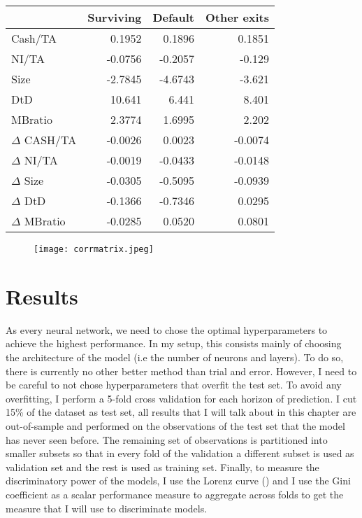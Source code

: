 \begin{table}[]
    \centering
    \begin{tabular}{lrrr}
    \hline \hline
                 & Surviving &   Default  & Other exits \\
    \hline
Cash/TA          &  0.1952 &  0.1896  &    0.1851 \\
NI/TA            & -0.0756 & -0.2057  &   -0.129 \\
Size             & -2.7845 & -4.6743  &   -3.621 \\
DtD              & 10.641 &  6.441  &    8.401 \\
MBratio          &  2.3774 &  1.6995  &    2.202 \\
$\Delta$ CASH/TA  & -0.0026 &  0.0023  &   -0.0074 \\
$\Delta$   NI/TA     & -0.0019 & -0.0433  &   -0.0148 \\
$\Delta$  Size      & -0.0305 & -0.5095  &   -0.0939 \\
$\Delta$   DtD       & -0.1366 & -0.7346  &    0.0295 \\
$\Delta$  MBratio   & -0.0285 &  0.0520  &    0.0801 \\
\hline
    \end{tabular}
    \label{tab:meanvar}
\end{table}


\begin{figure}[]
    \centering
    \texttt{[image: corrmatrix.jpeg]}
    \label{fig:corrmat}
\end{figure}

\section{Results}
\label{sec4}


As every neural network, we need to chose the optimal hyperparameters to achieve the highest performance. In my setup, this consists mainly of choosing the architecture of the model (i.e the number of neurons and layers). To do so, there is currently no other better method than trial and error. However, I need to be careful to not chose hyperparameters that overfit the test set. To avoid any overfitting, I perform a 5-fold cross validation for each horizon of prediction. I cut 15\% of the dataset as test set, all results that I will talk about in this chapter are out-of-sample and performed on the observations of the test set that the model has never seen before. The remaining set of observations is partitioned into smaller subsets so that in every fold of the validation a different subset is used as validation set and the rest is used as training set. Finally, to measure the discriminatory power of the models, I use the Lorenz curve (\citet{lorenz}) and I use the Gini coefficient as a scalar performance measure to aggregate across folds to get the  measure that I will use to discriminate models. \\

